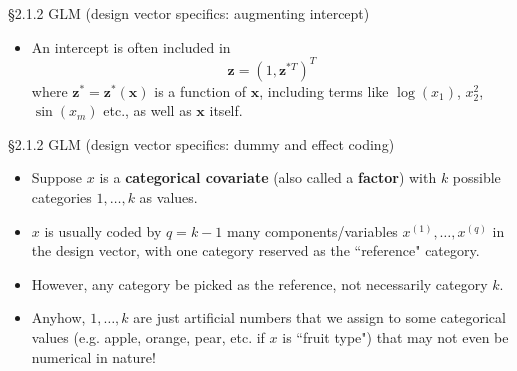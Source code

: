 \documentclass{beamer}
\newenvironment{wideitemize}%
  {\begin{itemize}%
    \setlength{\parskip}{1em}}%
  {\end{itemize}}
\begin{document}
\begin{frame}{\S2.1.2 GLM (design vector specifics: augmenting intercept)}
\noindent

\begin{itemize}
\item
An intercept is often included in
\[
\textbf{z}=(1,\textbf{z}^{*T})^T
\]
where $\textbf{z}^*=\textbf{z}^*(\textbf{x})$ is a function of $\textbf{x}$, including terms like $\log(x_1)$,
$x_2^2$, $\sin (x_m)$ etc., as well as $\textbf{x}$ itself.

\end{itemize}
\end{frame}



\begin{frame} {\S2.1.2 GLM (design vector specifics: dummy  and effect coding)}
\begin{wideitemize}

\item Suppose $x$ is a {\bf categorical covariate} (also called a {\bf factor}) with $k$ possible categories $1, \dots, k$ as values. 

\item  $x$ is usually   coded by $q = k -1$ many components/variables $x^{(1)}, \dots, x^{(q)}$ in the design vector, with one category reserved as the ``reference" category.

\item
However, any category be picked as the reference, not necessarily category $k$.

\item Anyhow, $1, \dots, k$ are just artificial numbers that we assign to some categorical values (e.g. apple, orange, pear, etc. if $x$ is ``fruit type") that may not even be numerical in nature!

\end{wideitemize}



\end{frame}
\end{document}
